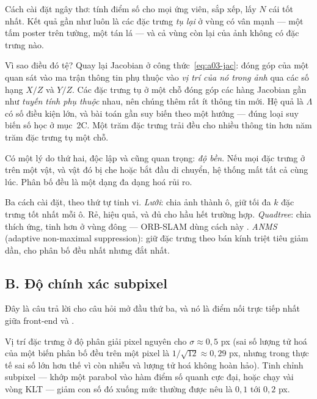 \documentclass[../../vslam.tex]{subfiles}
\begin{document}
Cách cài đặt ngây thơ: tính điểm số cho mọi ứng viên, sắp xếp, lấy \(N\) cái tốt nhất. Kết quả gần như luôn là các đặc trưng \emph{tụ lại} ở vùng có vân mạnh --- một tấm poster trên tường, một tán lá --- và cả vùng còn lại của ảnh không có đặc trưng nào.

Vì sao điều đó tệ? Quay lại Jacobian ở  công thức~\eqref{eq:a03-jac}: đóng góp của một quan sát vào ma trận thông tin phụ thuộc vào \emph{vị trí của nó trong ảnh} qua các số hạng \(X/Z\) và \(Y/Z\). Các đặc trưng tụ ở một chỗ đóng góp các hàng Jacobian gần như \emph{tuyến tính phụ thuộc} nhau, nên chúng thêm rất ít thông tin mới. Hệ quả là \(\Lambda\) có số điều kiện lớn, và bài toán gần suy biến theo một hướng --- đúng loại suy biến số học ở  mục~2C. Một trăm đặc trưng trải đều cho nhiều thông tin hơn năm trăm đặc trưng tụ một chỗ.

Có một lý do thứ hai, độc lập và cũng quan trọng: \emph{độ bền}. Nếu mọi đặc trưng ở trên một vật, và vật đó bị che hoặc bắt đầu di chuyển, hệ thống mất tất cả cùng lúc. Phân bố đều là một dạng đa dạng hoá rủi ro.

Ba cách cài đặt, theo thứ tự tinh vi. \emph{Lưới}: chia ảnh thành ô, giữ tối đa \(k\) đặc trưng tốt nhất mỗi ô. Rẻ, hiệu quả, và đủ cho hầu hết trường hợp. \emph{Quadtree}: chia thích ứng, tinh hơn ở vùng đông --- ORB-SLAM dùng cách này \cite{murartal2015orbslam}. \emph{ANMS} (adaptive non-maximal suppression): giữ đặc trưng theo bán kính triệt tiêu giảm dần, cho phân bố đều nhất nhưng đắt nhất.

\subsection{B. Độ chính xác subpixel}

Đây là câu trả lời cho câu hỏi mở đầu thứ ba, và nó là điểm nối trực tiếp nhất giữa front-end và .

Vị trí đặc trưng ở độ phân giải pixel nguyên cho \(\sigma \approx 0{,}5\) px (sai số lượng tử hoá của một biến phân bố đều trên một pixel là \(1/\sqrt{12} \approx 0{,}29\) px, nhưng trong thực tế sai số lớn hơn thế vì còn nhiễu và lượng tử hoá không hoàn hảo). Tinh chỉnh subpixel --- khớp một parabol vào hàm điểm số quanh cực đại, hoặc chạy vài vòng KLT --- giảm con số đó xuống mức thường được nêu là \(0{,}1\) tới \(0{,}2\) px.
\end{document}

